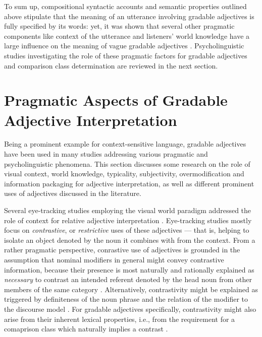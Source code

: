 To sum up, compositional syntactic accounts and semantic properties outlined above stipulate that the meaning of an utterance involving gradable adjectives is fully specified by its words: yet, it was shown that several other pragmatic components like context of the utterance and listeners’ world knowledge have a large influence on the meaning of vague gradable adjectives \parencite[e.g.,][]{tessler2017warm, Kennedy2007, sedivy1999}. Psycholinguistic studies investigating the role of these pragmatic factors for gradable adjectives and comparison class determination are reviewed in the next section. 

\section{Pragmatic Aspects of Gradable Adjective Interpretation}
\label{2.4.}
Being a prominent example for context-sensitive language, gradable adjectives have been used in many studies addressing various pragmatic and psycholinguistic phenomena. This section discusses some research on the role of visual context, world knowledge, typicality, subjectivity, overmodification and information packaging for adjective interpretation, as well as different prominent uses of adjectives discussed in the literature. %

Several eye-tracking studies employing the  visual world paradigm addressed the role of context for relative adjective interpretation \parencite[e.g.,][]{sedivy1999, Aparicio2016}.
Eye-tracking studies mostly focus on \textit{contrastive}, or \textit{restrictive} uses of these adjectives --- that is, helping to isolate an object denoted by the noun it combines with from the context. From a rather pragmatic perspective, conrastive use of adjectives is grounded in the assumption that nominal modifiers in general might convey contrastive information, because their presence is most naturally and rationally explained as \emph{necessary} to contrast an intended referent denoted by the head noun from other members of the same category \parencite{sedivy1999, clifton1989ambiguity}. Alternatively, contrastivity might be explained as triggered by definiteness of the noun phrase and the relation of the modifier to the discourse model \parencite{sedivy1999, steedman1989ambiguity}. For gradable adjectives specifically, contrastivity might also arise from their inherent lexical properties, i.e., from the requirement for a comaprison class which naturally implies a contrast \parencite{Bierwisch1989, sedivy1999}. 


